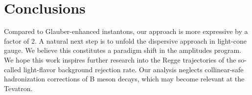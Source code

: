 \section{Conclusions}\label{sec:conclusions}

Compared to Glauber-enhanced instantons, our approach is more expressive
by a factor of 2. A natural next step is to unfold the dispersive
approach in light-cone gauge. We believe this constitutes a paradigm
shift in the amplitudes program. We hope this work inspires further
research into the Regge trajectories of the so-called light-flavor
background rejection rate. Our analysis neglects collinear-safe
hadronization corrections of B meson decays, which may become relevant
at the Tevatron.

